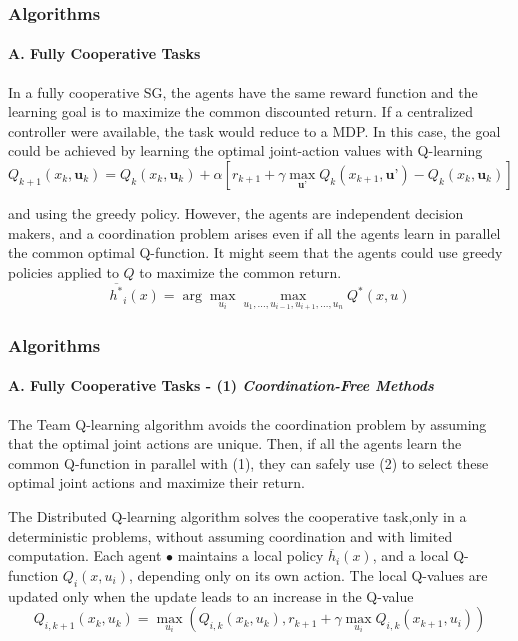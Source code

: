 \documentclass{beamer}
\begin{document}
\begin{frame}
\frametitle{Algorithms}
\framesubtitle{A. Fully Cooperative Tasks}
In a fully cooperative SG, the agents have the same reward function and the learning goal is to maximize the common discounted return. If a centralized controller were available, the task would reduce to a MDP. In this case, the goal could be achieved by learning the optimal joint-action values with Q-learning
\begin{equation}
Q_{k+1}(x_k,\textbf{u}_k) = Q_k(x_k, \textbf{u}_k) + \alpha[r_{k+1} + \gamma \max_{\textbf{u'}}Q_k(x_{k+1},\textbf{u'}) - Q_k(x_k, \textbf{u}_k)]
\end{equation}

and using the greedy policy. However, the agents are independent decision makers, and a coordination problem arises even if
all the agents learn in parallel the common optimal Q-function. It might seem that the agents could use greedy policies
applied to $Q$ to maximize the common return.
\begin{equation}
\overline{h^*}_i(x) = \arg\max_{u_i} \max_{u_1,\ldots,u_{i-1},u_{i+1},\ldots,u_n} Q^*(x, u)
\end{equation}
\end{frame}

\begin{frame}
\frametitle{Algorithms}
\framesubtitle{A. Fully Cooperative Tasks - (1) \textit{Coordination-Free Methods}}
The Team Q-learning algorithm avoids the coordination problem by assuming that the optimal joint actions are unique.
Then, if all the agents learn the common Q-function in parallel with (1), they can safely use (2) to select these optimal joint actions and maximize their return.\vspace{4pt}

The Distributed Q-learning algorithm solves the cooperative task,only in a deterministic
problems, without assuming coordination and with limited
computation. Each agent $•$ maintains a local policy $\overline{h}_i(x)$, and a
local Q-function $Q_i(x,u_i)$, depending only on its own action.
The local Q-values are updated only when the update leads to
an increase in the Q-value
\begin{equation}
Q_{i,k+1}(x_{k},u_{k}) = \max_{u_i} \left( Q_{i,k}(x_{k},u_{k}), r_{k+1} + \gamma \max_{u_i} Q_{i,k}(x_{k+1}, u_i) \right)
\end{equation}
\end{frame}
\end{document}
